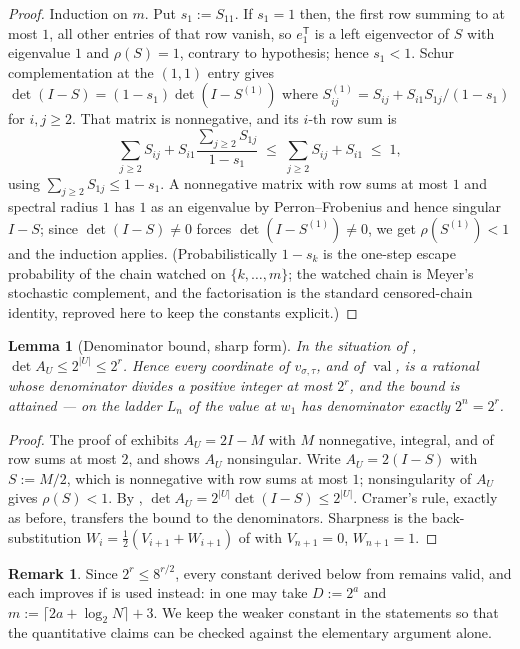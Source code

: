 \documentclass[11pt]{article}
\theoremstyle{plain}
\newtheorem{lemma}[theorem]{Lemma}
\theoremstyle{definition}
\newtheorem{remark}[theorem]{Remark}
\DeclareMathOperator{\val}{val}
\begin{document}
\begin{proof}
Induction on $m$. Put $s_1:=S_{11}$. If $s_1=1$ then, the first row summing
to at most $1$, all other entries of that row vanish, so $e_1^{\mathsf T}$
is a left eigenvector of $S$ with eigenvalue $1$ and $\rho(S)=1$,
contrary to hypothesis; hence $s_1<1$. Schur complementation at the
$(1,1)$ entry gives $\det(I-S)=(1-s_1)\det(I-S^{(1)})$ where
$S^{(1)}_{ij}=S_{ij}+S_{i1}S_{1j}/(1-s_1)$ for $i,j\ge2$. That matrix is
nonnegative, and its $i$-th row sum is
\[
  \sum_{j\ge2}S_{ij}+S_{i1}\frac{\sum_{j\ge2}S_{1j}}{1-s_1}
  \;\le\;\sum_{j\ge2}S_{ij}+S_{i1}\;\le\;1,
\]
using $\sum_{j\ge2}S_{1j}\le1-s_1$. A nonnegative matrix with row sums at
most $1$ and spectral radius $1$ has $1$ as an eigenvalue by
Perron--Frobenius and hence singular $I-S$; since $\det(I-S)\ne0$ forces
$\det(I-S^{(1)})\ne0$, we get $\rho(S^{(1)})<1$ and the induction applies.
(Probabilistically $1-s_k$ is the one-step escape probability of the chain
watched on $\{k,\dots,m\}$; the watched chain is Meyer's stochastic
complement, and the factorisation is the standard censored-chain identity,
reproved here to keep the constants explicit.)
\end{proof}

\begin{lemma}[Denominator bound, sharp form]\label{lem:denominator-sharp}
In the situation of , $\det A_U\le2^{|U|}\le2^{r}$.
Hence every coordinate of $v_{\sigma,\tau}$, and of $\val$, is a rational
whose denominator divides a positive integer at most $2^{r}$, and the
bound is attained --- on the ladder $L_n$ of  the value
at $w_1$ has denominator exactly $2^{n}=2^{r}$.
\end{lemma}

\begin{proof}
The proof of  exhibits $A_U=2I-M$ with $M$
nonnegative, integral, and of row sums at most $2$, and shows $A_U$
nonsingular. Write $A_U=2(I-S)$ with $S:=M/2$, which is nonnegative with
row sums at most $1$; nonsingularity of $A_U$ gives $\rho(S)<1$. By
, $\det A_U=2^{|U|}\det(I-S)\le2^{|U|}$. Cramer's rule,
exactly as before, transfers the bound to the denominators. Sharpness is
the back-substitution $W_i=\tfrac12(V_{i+1}+W_{i+1})$ of
 with $V_{n+1}=0$, $W_{n+1}=1$.
\end{proof}

\begin{remark}
Since $2^{r}\le8^{r/2}$, every constant derived below from
 remains valid, and each improves if
 is used instead: in
 one may take $D:=2^{a}$ and
$m:=\lceil 2a+\log_2 N\rceil+3$. We keep the weaker constant in the
statements so that the quantitative claims can be checked against the
elementary argument alone.
\end{remark}
\end{document}
